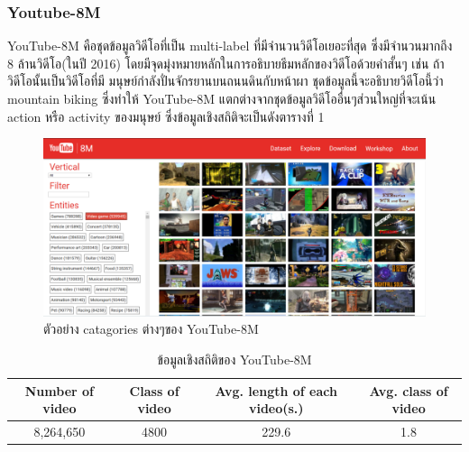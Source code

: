 \subsubsection*{Youtube-8M}
YouTube-8M คือชุดข้อมูลวิดีโอที่เป็น multi-label ที่มีจำนวนวิดีโอเยอะที่สุด ซึ่งมีจำนวนมากถึง 8 ล้านวิดีโอ(ในปี 2016) โดยมีจุดมุ่งหมายหลักในการอธิบายธีมหลักของวิดีโอด้วยคำสั้นๆ เช่น ถ้าวิดีโอนั้นเป็นวิดีโอที่มี มนุษย์กำลังปั่นจักรยานบนถนนดินกับหน้าผา ชุดข้อมูลนี้จะอธิบายวิดีโอนี้ว่า mountain biking ซึ่งทำให้ YouTube-8M แตกต่างจากชุดข้อมูลวิดีโออื่นๆส่วนใหญ่ที่จะเน้น action หรือ activity ของมนุษย์ ซึ่งข้อมูลเชิงสถิติจะเป็นดังตารางที่ 1

\begin{figure}[!ht]
	\centering
	\includegraphics[width=1\textwidth]{chapter2/images/youtube-8m.png}
		\caption{ตัวอย่าง catagories ต่างๆของ YouTube-8M}
    	\label{fig:youtube-8m}
\end{figure}

\begin{table}[!ht]
\begin{tabular}{|c|c|c|c|}
		\hline
		{Number of video}&{Class of video}&{Avg. length of each video(s.)}&{Avg. class of video}				\\
		\hline
		8,264,650		& 4800		& 229.6		& 1.8											\\
		\hline
	\end{tabular}
	\caption{ข้อมูลเชิงสถิติของ YouTube-8M}
	\label{tab: ข้อมูลเชิงสถิติของ YouTube-8M}
\end{table}

